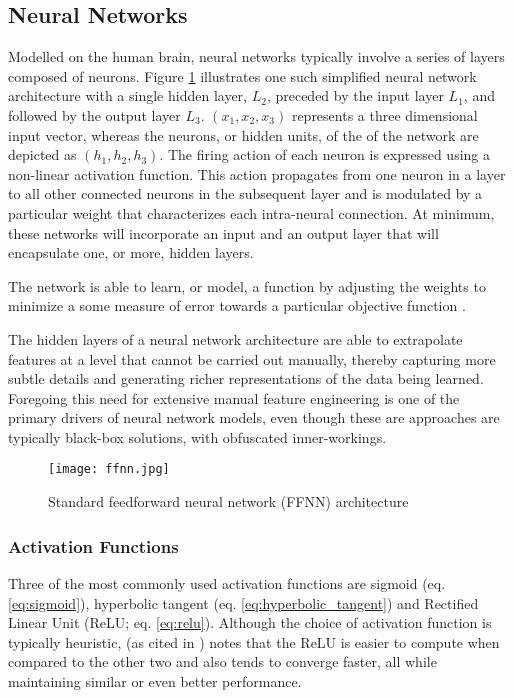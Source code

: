 \documentclass[../../fyp.tex]{subfiles}
\begin{document}
\subsection{Neural Networks}
Modelled on the human brain, neural networks typically involve a series of layers composed of neurons. Figure \ref{fig:ffnn} illustrates one such simplified neural network architecture with a single hidden layer, $L_2$, preceded by the input layer $L_1$, and followed by the output layer $L_3$. $(x_1, x_2, x_3)$ represents a three dimensional input vector, whereas the neurons, or hidden units, of the of the network are depicted as $(h_1, h_2, h_3)$. The firing action of each neuron is expressed using a non-linear activation function. This action propagates from one neuron in a layer to all other connected neurons in the subsequent layer and is modulated by a particular weight that characterizes each intra-neural connection. At minimum, these networks will incorporate an input and an output layer that will encapsulate one, or more, hidden layers.

The network is able to learn, or model, a function by adjusting the weights to minimize a some measure of error towards a particular objective function \citep{graves2012b}.

The hidden layers of a neural network architecture are able to extrapolate features at a level that cannot be carried out manually, thereby capturing more subtle details and generating richer representations of the data being learned. Foregoing this need for extensive manual feature engineering is one of the primary drivers of neural network models, even though these are approaches are typically black-box solutions, with obfuscated inner-workings.

\begin{figure}[!ht]
	\centering
	\texttt{[image: ffnn.jpg]}
	\caption{Standard feedforward neural network (FFNN) architecture \citep{zhang2018}}
	\label{fig:ffnn}
\end{figure}

\subsubsection{Activation Functions}
Three of the most commonly used activation functions are sigmoid (eq. \ref{eq:sigmoid}), hyperbolic tangent (eq. \ref{eq:hyperbolic_tangent}) and Rectified Linear Unit (ReLU; eq. \ref{eq:relu}). Although the choice of activation function is typically heuristic, \citet{glorot2011} (as cited in \citep{zhang2018}) notes that the ReLU is easier to compute when compared to the other two and also tends to converge faster, all while maintaining similar or even better performance.
\end{document}
